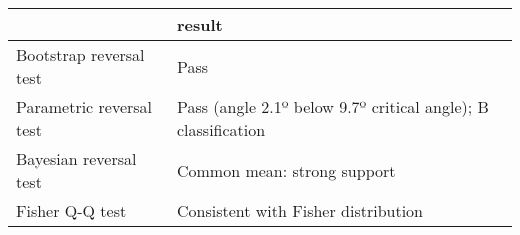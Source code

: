 \begin{tabular}{ll}
\toprule
{} &                                                         result \\
\midrule
Bootstrap reversal test  &                                                           Pass \\
Parametric reversal test &  Pass (angle 2.1º below 9.7º critical angle); B classification \\
Bayesian reversal test   &                                    Common mean: strong support \\
Fisher Q-Q test          &                            Consistent with Fisher distribution \\
\bottomrule
\end{tabular}
